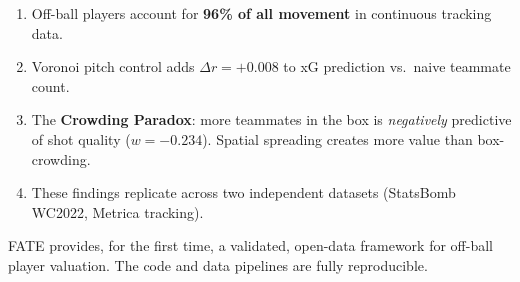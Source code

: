 \documentclass[10pt,twocolumn]{article}
\begin{document}
\begin{enumerate}
  \item Off-ball players account for \textbf{96\% of all movement} in continuous tracking data.
  \item Voronoi pitch control adds \textbf{$\Delta r = +0.008$} to xG prediction vs.\ naive teammate count.
  \item The \textbf{Crowding Paradox}: more teammates in the box is \emph{negatively} predictive of shot quality ($w = -0.234$). Spatial spreading creates more value than box-crowding.
  \item These findings replicate across two independent datasets (StatsBomb WC2022, Metrica tracking).
\end{enumerate}

FATE provides, for the first time, a validated, open-data framework for off-ball player valuation. The code and data pipelines are fully reproducible.
\end{document}
